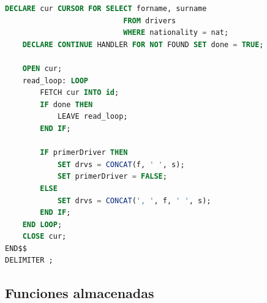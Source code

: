 \documentclass{db-practice}
\begin{document}
\begin{enumerate}
\begin{lstlisting}[language=SQL]
    DECLARE cur CURSOR FOR SELECT forname, surname 
                           FROM drivers
                           WHERE nationality = nat;
    DECLARE CONTINUE HANDLER FOR NOT FOUND SET done = TRUE;
    
    OPEN cur;
    read_loop: LOOP
        FETCH cur INTO id;
        IF done THEN
            LEAVE read_loop;
        END IF;
        
        IF primerDriver THEN
            SET drvs = CONCAT(f, ' ', s);
            SET primerDriver = FALSE;
        ELSE
            SET drvs = CONCAT(', ', f, ' ', s);
        END IF;
    END LOOP;
    CLOSE cur;
END$$
DELIMITER ;
\end{lstlisting}

\end{enumerate}

\subsection{Funciones almacenadas}
\end{document}
